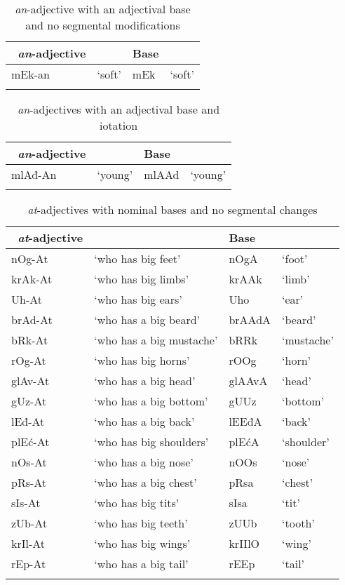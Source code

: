 \documentclass[output=paper]{langsci/langscibook}
\begin{document}
\begin{table}
\caption{\textit{an}-adjective with an adjectival base and no segmental modifications}
\label{tabapp4}
 \begin{tabular}{ l l l l}
\lsptoprule  
\ \textit{an}-adjective &  & Base & 
\\ 
\hline
mEk-an & `soft' & mEk & `soft'
\\
 \lspbottomrule
 \end{tabular}
\end{table} 

\begin{table}
\caption{\textit{an}-adjectives with an adjectival base and iotation}
\label{tabapp5}
 \begin{tabular}{ l l l l}
\lsptoprule  
\ \textit{an}-adjective &  & Base & 
\\ 
\hline
mlAđ-An & `young' & mlAAd & `young'
\\
 \lspbottomrule
 \end{tabular}
\end{table} 

\begin{table}
\caption{\textit{at}-adjectives with nominal bases and no segmental changes}
\label{tabapp6}          
 \begin{tabular}{ l l l l}          
\lsptoprule            
\ \textit{at}-adjective &  & Base &    
\\  
\hline
nOg-At & `who has big feet' & nOgA & `foot' 
\\  krAk-At & `who has big limbs' & krAAk & `limb' 
\\  Uh-At & `who has big ears' & Uho & `ear' 
\\  brAd-At & `who has a big beard' & brAAdA & `beard' 
\\  bRk-At & `who has a big mustache' & bRRk & `mustache' 
\\  rOg-At & `who has big horns' & rOOg & `horn' 
\\  glAv-At & `who has a big head' & glAAvA & `head' 
\\  gUz-At & `who has a big bottom' & gUUz & `bottom' 
\\  lEđ-At & `who has a big back' & lEEđA & `back' 
\\  plEć-At & `who has big shoulders' & plEćA & `shoulder' 
\\  nOs-At & `who has a big nose' & nOOs & `nose' 
\\  pRs-At & `who has a big chest' & pRsa & `chest' 
\\  sIs-At & `who has big tits' & sIsa & `tit' 
\\  zUb-At & `who has big teeth' & zUUb & `tooth' 
\\  krIl-At & `who has big wings' & krIIlO & `wing' 
\\  rEp-At & `who has a big tail' & rEEp & `tail' \\
 \lspbottomrule         
 \end{tabular}          
\end{table}           
          
\end{document}
